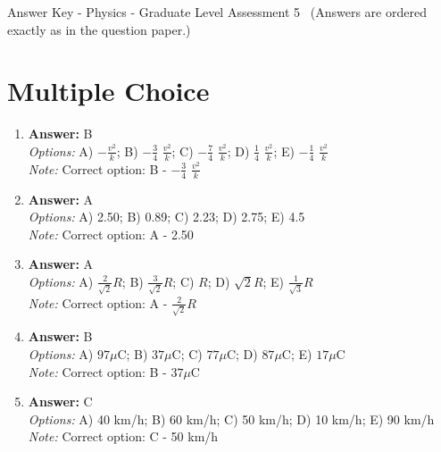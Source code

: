 \documentclass[12pt]{article}
\begin{document}
\begin{center}
Answer Key - Physics - Graduate Level Assessment 5 \
\small (Answers are ordered exactly as in the question paper.)
\end{center}

\section*{Multiple Choice}
\begin{enumerate}[label=\arabic*.]
\item \textbf{Answer:} B
\\ \textit{Options:} A) $-\frac{v^2}{k}$; B) $-\frac{3}{4}$ $\frac{v^2}{k}$; C) $-\frac{7}{4}$ $\frac{v^2}{k}$; D) $\frac{1}{4}$ $\frac{v^2}{k}$; E) $-\frac{1}{4}$ $\frac{v^2}{k}$
\\ \textit{Note:} Correct option: B - $-\frac{3}{4}$ $\frac{v^2}{k}$
\item \textbf{Answer:} A
\\ \textit{Options:} A) 2.50; B) 0.89; C) 2.23; D) 2.75; E) 4.5
\\ \textit{Note:} Correct option: A - 2.50
\item \textbf{Answer:} A
\\ \textit{Options:} A) $\frac{2}{\sqrt{2}}R$; B) $\frac{3}{\sqrt{2}}R$; C) $R$; D) $\sqrt{2}R$; E) $\frac{1}{\sqrt{3}}R$
\\ \textit{Note:} Correct option: A - $\frac{2}{\sqrt{2}}R$
\item \textbf{Answer:} B
\\ \textit{Options:} A) $97 \mu \mathrm{C}$; B) $37$$\mu \mathrm{C}$; C) $77 \mu \mathrm{C}$; D) $87 \mu \mathrm{C}$; E) $17 \mu \mathrm{C}$
\\ \textit{Note:} Correct option: B - $37$$\mu \mathrm{C}$
\item \textbf{Answer:} C
\\ \textit{Options:} A) 40 km/h; B) 60 km/h; C) 50 km/h; D) 10 km/h; E) 90 km/h
\\ \textit{Note:} Correct option: C - 50 km/h
\end{enumerate}
\end{document}
